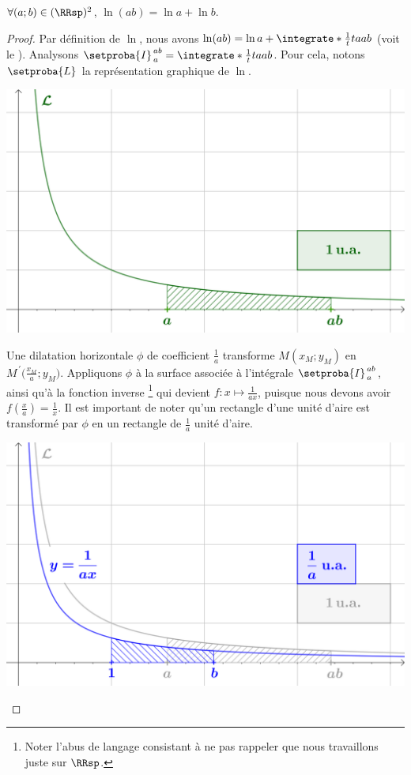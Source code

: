 \begin{fact}
	$\forall (a;b) \in ( \RRsp )^2$,
	$\ln(a b) = \ln a + \ln b$.
\end{fact}


\begin{proof}
	Par définition de $\ln$, nous avons 
	$\ln(a b) = \ln a + \integrate*{\frac1t}{t}{a}{ab}$
	(voit le ).
	Analysons $\setproba{I}_{\,a}^{\,ab} = \integrate*{\frac1t}{t}{a}{ab}$.
	Pour cela, notons $\setproba{L}$ la représentation graphique  de $\ln$.
	
	\begin{center}
		\includegraphics[scale=.5]{content/ln/func-eq-1.png}
	\end{center}

	Une dilatation horizontale $\phi$ de coefficient $\frac1a$ transforme $M(x_M ; y_M)$ en $M^{\,\prime}\big( \frac{x_M}{a} ; y_M)$. 
	Appliquons $\phi$ à la surface associée à l'intégrale $\setproba{I}_{\,a}^{\,ab}$, ainsi qu'à la fonction inverse%
	\footnote{
		Noter l'abus de langage consistant à ne pas rappeler que nous travaillons juste sur $\RRsp$.
	}
	qui devient $f: x \mapsto \frac{1}{a x}$, puisque nous devons avoir $f(\frac{x}{a}) = \frac{1}{x}$. 
	Il est important de noter qu'un rectangle d'une unité d'aire est transformé par $\phi$ en un rectangle de $\frac1a$ unité d'aire.

	\begin{center}
		\includegraphics[scale=.5]{content/ln/func-eq-2.png}
	\end{center}


\end{proof}

